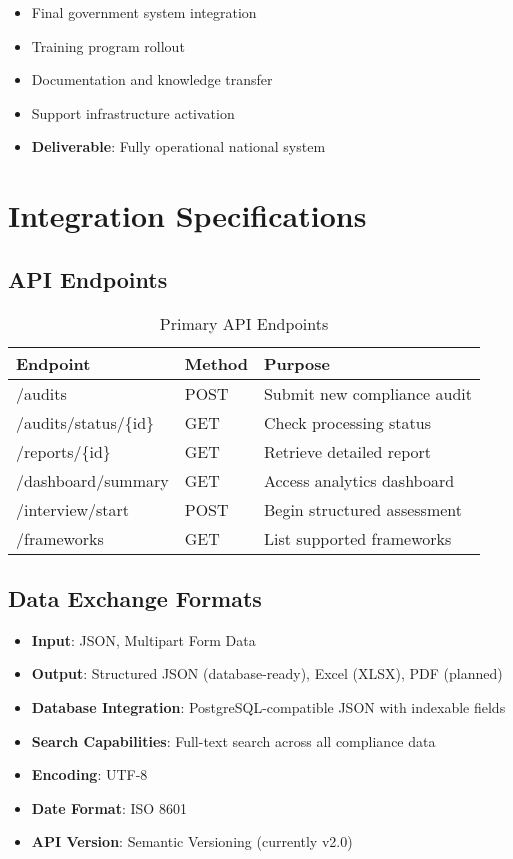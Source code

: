 \documentclass[11pt,a4paper]{article}
\begin{document}
\begin{itemize}
    \item Final government system integration
    \item Training program rollout
    \item Documentation and knowledge transfer
    \item Support infrastructure activation
    \item \textbf{Deliverable}: Fully operational national system
\end{itemize}

\section{Integration Specifications}

\subsection{API Endpoints}

\begin{table}[H]
\centering
\footnotesize
\begin{tabular}{p{3.5cm}p{2cm}p{6.5cm}}
\toprule
\textbf{Endpoint} & \textbf{Method} & \textbf{Purpose} \\
\midrule
/audits & POST & Submit new compliance audit \\
/audits/status/\{id\} & GET & Check processing status \\
/reports/\{id\} & GET & Retrieve detailed report \\
/dashboard/summary & GET & Access analytics dashboard \\
/interview/start & POST & Begin structured assessment \\
/frameworks & GET & List supported frameworks \\
\bottomrule
\end{tabular}
\caption{Primary API Endpoints}
\end{table}

\subsection{Data Exchange Formats}

\begin{techspec}
\begin{itemize}
    \item \textbf{Input}: JSON, Multipart Form Data
    \item \textbf{Output}: Structured JSON (database-ready), Excel (XLSX), PDF (planned)
    \item \textbf{Database Integration}: PostgreSQL-compatible JSON with indexable fields
    \item \textbf{Search Capabilities}: Full-text search across all compliance data
    \item \textbf{Encoding}: UTF-8
    \item \textbf{Date Format}: ISO 8601
    \item \textbf{API Version}: Semantic Versioning (currently v2.0)
\end{itemize}
\end{techspec}
\end{document}
